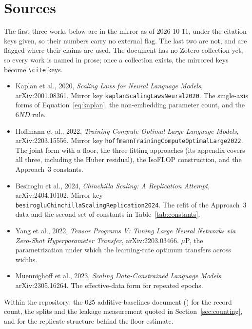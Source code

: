 
\section{Sources}
\label{sec:sources}

The first three works below are in the mirror as of 2026-10-11, under the
citation keys given, so their numbers carry no external flag. The last two are
not, and are flagged where their claims are used. The document has no Zotero
collection yet, so every work is named in prose; once a collection exists, the
mirrored keys become \texttt{\textbackslash cite} keys.

\begin{itemize}
\item Kaplan et al., 2020, \emph{Scaling Laws for Neural Language Models},
arXiv:2001.08361.\newline
Mirror key \texttt{kaplanScalingLawsNeural2020}.\newline
The single-axis forms of Equation~\ref{eq:kaplan}, the
non-embedding parameter count, and the $6ND$ rule.
\item Hoffmann et al., 2022, \emph{Training Compute-Optimal Large Language
Models}, arXiv:2203.15556.\newline
Mirror key \texttt{hoffmannTrainingComputeOptimalLarge2022}.\newline
The joint form with a floor, the three fitting
approaches (its appendix covers all three, including the Huber residual), the
IsoFLOP construction, and the Approach~3 constants.
\item Besiroglu et al., 2024, \emph{Chinchilla Scaling: A Replication Attempt},
arXiv:2404.10102.\newline
Mirror key \texttt{besirogluChinchillaScalingReplication2024}.\newline
The refit of the Approach~3 data and the second set of
constants in Table~\ref{tab:constants}.
\item Yang et al., 2022, \emph{Tensor Programs V: Tuning Large Neural Networks
via Zero-Shot Hyperparameter Transfer}, arXiv:2203.03466. $\mu$P, the
parametrization under which the learning-rate optimum transfers across widths.
\item Muennighoff et al., 2023, \emph{Scaling Data-Constrained Language Models},
arXiv:2305.16264. The effective-data form for repeated epochs.
\end{itemize}

Within the repository: the 025 additive-baselines document
() for the record count, the
splits and the leakage measurement quoted in Section~\ref{sec:counting}, and
 for
the replicate structure behind the floor estimate.

